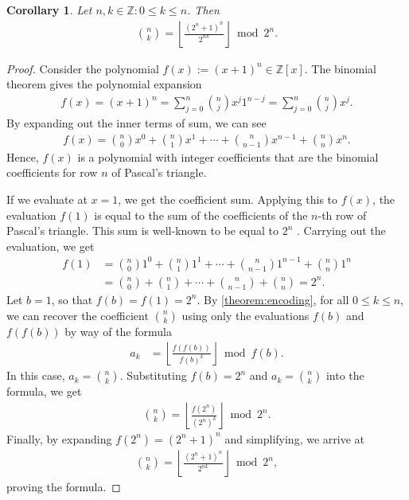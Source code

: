 \documentclass[10pt]{article}
\theoremstyle{plain}
\newtheorem{corollary}{Corollary}[section]
\newcommand{\floor}[1]{\left\lfloor #1 \right\rfloor}
\begin{document}
\begin{corollary} \label{corollary:binomialcoefficients}
Let $n,k \in \mathbb{Z} : 0 \leq k \leq n$. Then
\begin{align*}
\binom{n}{k} = \floor{\frac{(2^n+1)^n}{2^{n k}}} \bmod{2^n} .
\end{align*}
\end{corollary}
\begin{proof}
Consider the polynomial $f(x) := (x+1)^n \in \mathbb{Z}[x]$. The binomial theorem gives the polynomial expansion
\begin{align*}
f(x) = (x+1)^n = \sum_{j=0}^n \binom{n}{j} x^j 1^{n-j} = \sum_{j=0}^n \binom{n}{j} x^j .
\end{align*}
By expanding out the inner terms of sum, we can see
\begin{align*}
f(x) = \binom{n}{0} x^0 + \binom{n}{1} x^1 + \cdots + \binom{n}{n-1} x^{n-1} + \binom{n}{n} x^{n} .
\end{align*}
Hence, $f(x)$ is a polynomial with integer coefficients that are the binomial coefficients for row $n$ of Pascal's triangle. 

If we evaluate at $x=1$, we get the coefficient sum. Applying this to $f(x)$, the evaluation $f(1)$ is equal to the sum of the coefficients of the $n$-th row of Pascal's triangle. This sum is well-known to be equal to $2^n$ \cite{A000079}. Carrying out the evaluation, we get
\begin{align*}
f(1) &= \binom{n}{0} 1^0 + \binom{n}{1} 1^1 + \cdots + \binom{n}{n-1} 1^{n-1} + \binom{n}{n} 1^n \\
&= \binom{n}{0} + \binom{n}{1} + \cdots + \binom{n}{n-1} + \binom{n}{n} = 2^n .
\end{align*}
Let $b = 1$, so that $f(b) = f(1) = 2^n$. By \cref{theorem:encoding}, for all $0 \leq k \leq n$, we can recover the coefficient $\binom{n}{k}$ using only the evaluations $f(b)$ and $f(f(b))$ by way of the formula
\begin{align*}
    a_k &= \floor{\frac{f(f(b))}{f(b)^k}} \bmod{f(b)} .
\end{align*}
In this case, $a_k = \binom{n}{k}$. Substituting $f(b) = 2^n$ and $a_k = \binom{n}{k}$ into the formula, we get
\begin{align*}
    \binom{n}{k} = \floor{\frac{f(2^n)}{(2^n)^k}} \bmod{2^n} .
\end{align*}
Finally, by expanding $f(2^n) = (2^n+1)^n$ and simplifying, we arrive at
\begin{align*}
    \binom{n}{k} = \floor{\frac{(2^n+1)^n}{2^{nk}}} \bmod{2^n} ,
\end{align*}
proving the formula.
\end{proof}
\end{document}
